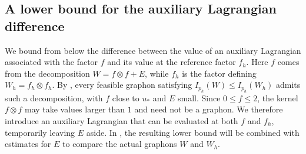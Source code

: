 \subsection{A lower bound for the auxiliary Lagrangian difference}
\label{sec:auxiliary-lagrangian}

We bound from below the difference between the
value of an auxiliary Lagrangian associated with the factor $f$ and its value
at the reference factor $f_h$.  Here $f$ comes from the
decomposition $W=f\otimes f+E$, while $f_h$ is the factor defining
$W_h=f_h\otimes f_h$.  By , every
feasible graphon satisfying $I_{p_h}(W)\le I_{p_h}(W_h)$ admits such a
decomposition, with $f$ close to $u_*$ and $E$ small.  Since $0\le f\le2$,
the kernel $f\otimes f$ may take values larger than $1$ and need not be a
graphon.  We therefore introduce an auxiliary Lagrangian that can be evaluated
at both $f$ and $f_h$, temporarily leaving $E$ aside.  In
, the resulting lower bound will be
combined with estimates for $E$ to compare the actual graphons $W$ and $W_h$.


